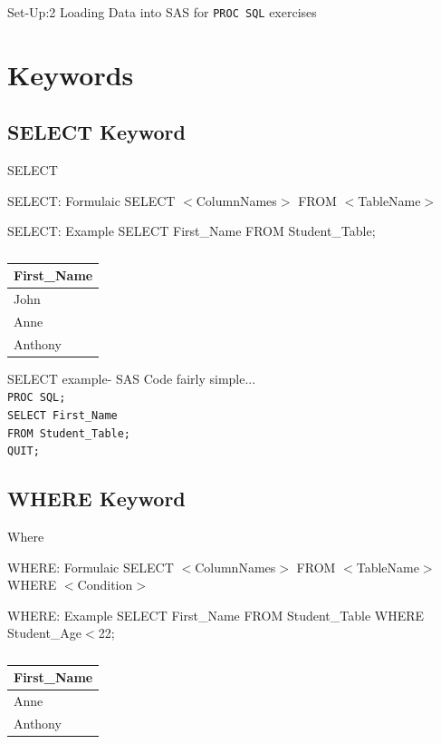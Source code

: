 \documentclass{beamer}
\begin{document}
\begin{frame}{Set-Up:2}
	Loading Data into SAS for \texttt{PROC SQL} exercises
\end{frame}
	
	\section{Keywords}
	
	\subsection{SELECT Keyword}
	\begin{frame}{SELECT}
		\begin{block}{SELECT: Formulaic}
			SELECT $<$ColumnNames$>$ FROM $<$TableName$>$ 
		\end{block}
		\begin{block}{SELECT: Example}
			SELECT First\_Name FROM Student\_Table;
		\end{block}
\begin{table}[H]
	\centering
	\caption*{}

	\begin{tabular}{|l|}
		\hline
		 First\_Name  \\ \hline
			John \\ \hline
			Anne  \\ \hline
			Anthony  \\    \hline
	\end{tabular}
\end{table}			
	\end{frame}
	
	\begin{frame}{SELECT example- SAS}
		Code fairly simple... \\ \pause 
		\texttt{PROC SQL;} \\
		\texttt{SELECT First\_Name } \\
		\texttt{FROM Student\_Table;}\\
		\texttt{QUIT;}
	\end{frame}
	
	\subsection{WHERE Keyword}
	\begin{frame}{Where}
		\begin{block}{WHERE: Formulaic}
			SELECT $<$ColumnNames$>$ FROM $<$TableName$>$ 
			WHERE $<$Condition$>$
		\end{block}
		\begin{block}{WHERE: Example}
			SELECT First\_Name FROM Student\_Table 
			WHERE Student\_Age$<$22;
		\end{block}
	\begin{table}[H]
	\centering
	\caption*{}

	\begin{tabular}{|l|}
		\hline
		First\_Name  \\ \hline
		Anne  \\ \hline
		Anthony  \\    \hline
	\end{tabular}
	\end{table}		
	\end{frame}
	
\end{document}
